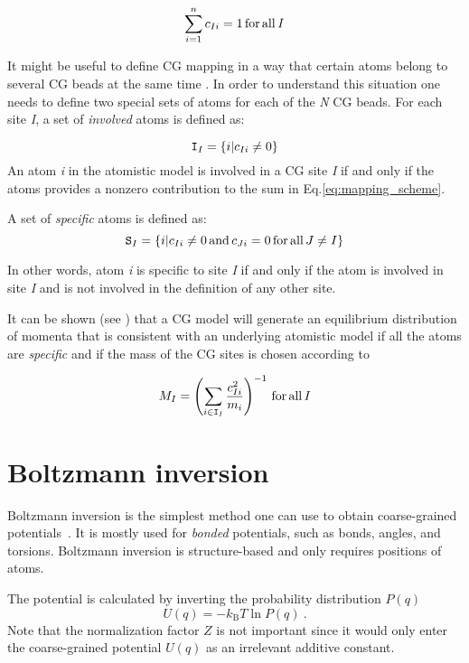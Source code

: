 \begin{equation}
 \sum_{i=1}^{n}c_{Ii}=1\, \rm for\, all\, \it I
\end{equation}

It might be useful to define CG mapping in a way that certain atoms belong to several CG beads at the same time \cite{Fritz:2009}.
In order to understand this situation one needs to define two special sets of atoms for each of the {\it N} CG beads. For each site {\it I}, a set of {\it involved} atoms is defined as:

\begin{equation}
 {\tt I}_I=\{i|c_{Ii}\ne0\}
\end{equation}
An atom {\it i} in the atomistic model is involved in a CG site {\it I} if and only if the atoms provides a nonzero contribution to the sum in Eq.\ref{eq:mapping_scheme}.

A set of {\it specific} atoms is defined as:
\begin{equation}
 {\tt S}_I=\{i|c_{Ii}\ne0\, {\rm and}\, c_{Ji}=0\, {\rm for\,all}\, J\ne I\}
\end{equation}

In other words, atom {\it i} is specific to site {\it I} if and only if the atom is involved in site {\it I} and is not involved in the definition of any other site.

It can be shown (see \cite{Noid:2008.1}) that a CG model will generate an equilibrium distribution of momenta that is consistent with an underlying atomistic model if all the atoms are {\it specific} and if the mass of the CG sites is chosen according to

\begin{equation}
M_I= \left( \sum_{i \in {\tt I}_I}\frac{c_{Ii}^2}{m_i} \right)^{-1}\, \rm for\, all\, {\it I}
\end{equation}

\section{Boltzmann inversion}
Boltzmann inversion is the simplest method one can use to obtain coarse-grained potentials~\cite{Tschoep:1998}. It is mostly used for {\em bonded} potentials, such as bonds, angles, and torsions. Boltzmann inversion is structure-based and only requires positions of atoms.

The potential is calculated by inverting the probability distribution $P(q)$ 
\begin{equation}
  U(q) = - k_\text{B} T \ln  P(q) ~.
  \label{eq:inv_boltzmann}
\end{equation}
%
Note that the normalization factor $Z$ is not important since it would only enter the coarse-grained potential $U(q)$ as an irrelevant additive constant.

